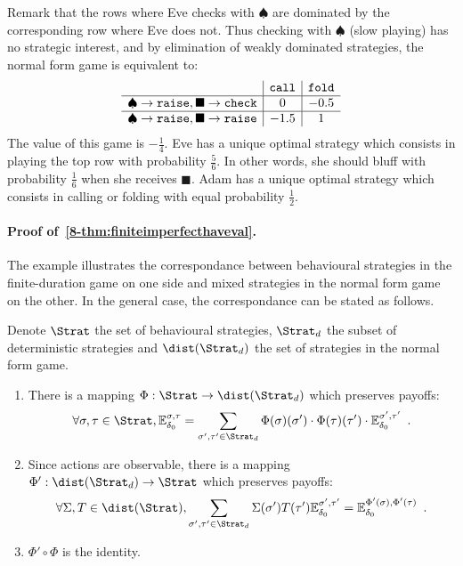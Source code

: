 Remark that the rows where Eve checks with $\spadesuit$
are dominated by the corresponding row where Eve does not.
Thus checking with $\spadesuit$ (slow playing) has no strategic interest,
and  by elimination of weakly dominated strategies,
the normal form game is equivalent to:
\[
\begin{array}{c|c|c}
&  {\tt call} &{\tt fold}\\
\hline
\spadesuit\to {\tt raise},  \blacksquare\to {\tt check}
& 0 & -0.5\\
\hline
\spadesuit\to {\tt raise},  \blacksquare\to {\tt raise}
& -1.5 & 1\\
\end{array}
\]
The value of this game is $-\frac{1}{4}$.
Eve has a unique optimal strategy which consists in playing the top row with probability
$\frac{5}{6}$.
In other words, she should bluff with probability $\frac{1}{6}$ when she receives $\blacksquare$.
Adam has a unique optimal strategy which consists in calling or folding
with equal probability $\frac{1}{2}$\enspace.
 
 
\paragraph{Proof of~\cref{8-thm:finiteimperfecthaveval}.}
The example illustrates
the correspondance between behavioural strategies in the finite-duration game on one side
and mixed strategies in the normal form game on the other.
In the general case, the correspondance can be stated as follows.

\begin{lemma}
\label{8-lem:impinffinite}
Denote $\Strat$ the set of behavioural strategies,
$\Strat_d$ the subset of deterministic strategies
and $\dist(\Strat_d)$ the set of strategies in the normal form game.
\begin{enumerate}
\item There is a mapping 
$
\Phi : \Strat \to \dist(\Strat_d)
$ 
which preserves payoffs:
\[
\forall \sigma,\tau \in \Strat,
\mathbb{E}_{\ini}^{\sigma,\tau}
=
\sum_{\sigma',\tau' \in \Strat_d}\Phi(\sigma)(\sigma')\cdot\Phi(\tau)(\tau') 
\cdot\mathbb{E}_{\ini}^{\sigma',\tau'}\enspace.
\]
\item Since actions are observable,
there is a mapping 
$
\Phi' : \dist(\Strat_d) \to \Strat 
$ 
which preserves payoffs:
\[
\forall \Sigma,T \in \dist(\Strat),
\sum_{\sigma',\tau' \in \Strat_d}\Sigma(\sigma') T(\tau')
\mathbb{E}_{\ini}^{\sigma',\tau'}
=
\mathbb{E}_{\ini}^{\Phi'(\sigma),\Phi'(\tau)}
\enspace.
\]
\item $\Phi'\circ \Phi$ is the identity.
\end{enumerate}
\end{lemma}

